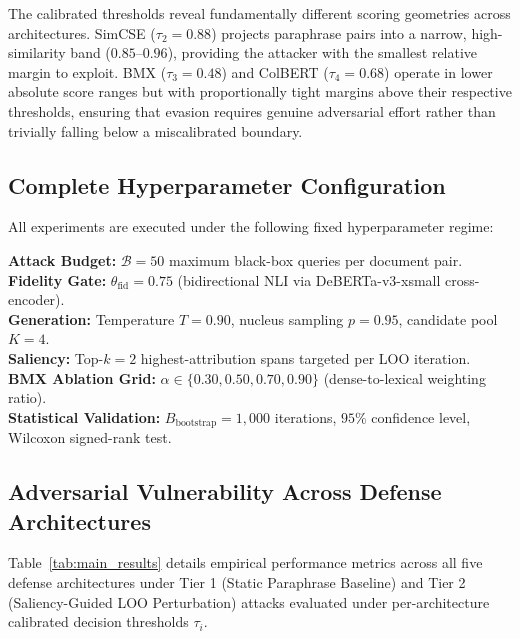 \documentclass[conference,onecolumn,11pt]{IEEEtran}
\newcommand{\notationblock}[1]{\begin{notationbox}#1\end{notationbox}}
\begin{document}
The calibrated thresholds reveal fundamentally different scoring geometries across architectures. SimCSE ($\tau_2 = 0.88$) projects paraphrase pairs into a narrow, high-similarity band ($0.85$--$0.96$), providing the attacker with the smallest relative margin to exploit. BMX ($\tau_3 = 0.48$) and ColBERT ($\tau_4 = 0.68$) operate in lower absolute score ranges but with proportionally tight margins above their respective thresholds, ensuring that evasion requires genuine adversarial effort rather than trivially falling below a miscalibrated boundary.

\subsection{Complete Hyperparameter Configuration}

All experiments are executed under the following fixed hyperparameter regime:

\notationblock{%
\textbf{Attack Budget:} $\mathcal{B} = 50$ maximum black-box queries per document pair. \\
\textbf{Fidelity Gate:} $\theta_{\text{fid}} = 0.75$ (bidirectional NLI via DeBERTa-v3-xsmall cross-encoder). \\
\textbf{Generation:} Temperature $T = 0.90$, nucleus sampling $p = 0.95$, candidate pool $K = 4$. \\
\textbf{Saliency:} Top-$k = 2$ highest-attribution spans targeted per LOO iteration. \\
\textbf{BMX Ablation Grid:} $\alpha \in \{0.30, 0.50, 0.70, 0.90\}$ (dense-to-lexical weighting ratio). \\
\textbf{Statistical Validation:} $B_{\text{bootstrap}} = 1{,}000$ iterations, $95\%$ confidence level, Wilcoxon signed-rank test.
}

\subsection{Adversarial Vulnerability Across Defense Architectures}

Table~\ref{tab:main_results} details empirical performance metrics across all five defense architectures under Tier 1 (Static Paraphrase Baseline) and Tier 2 (Saliency-Guided LOO Perturbation) attacks evaluated under per-architecture calibrated decision thresholds $\tau_i$.
\end{document}
